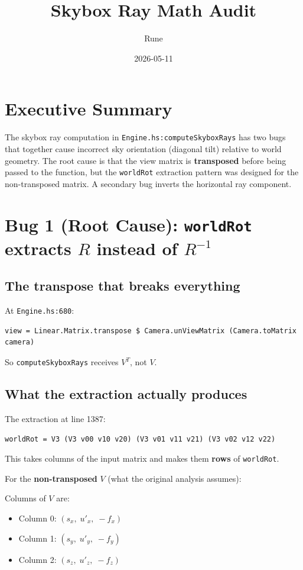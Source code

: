\documentclass{article}
\title{Skybox Ray Math Audit}
\author{Rune}
\date{2026-05-11}
\begin{document}
\maketitle

\section{Executive Summary}

The skybox ray computation in \texttt{Engine.hs:computeSkyboxRays} has two bugs
that together cause incorrect sky orientation (diagonal tilt) relative to world
geometry. The root cause is that the view matrix is \textbf{transposed} before
being passed to the function, but the \texttt{worldRot} extraction pattern was
designed for the non-transposed matrix. A secondary bug inverts the horizontal
ray component.

\section{Bug 1 (Root Cause): \texttt{worldRot} extracts $R$ instead of $R^{-1}$}

\subsection{The transpose that breaks everything}

At \texttt{Engine.hs:680}:
\begin{verbatim}
view = Linear.Matrix.transpose $ Camera.unViewMatrix (Camera.toMatrix camera)
\end{verbatim}

So \texttt{computeSkyboxRays} receives $V^T$, not $V$.

\subsection{What the extraction actually produces}

The extraction at line 1387:
\begin{verbatim}
worldRot = V3 (V3 v00 v10 v20) (V3 v01 v11 v21) (V3 v02 v12 v22)
\end{verbatim}

This takes columns of the input matrix and makes them \textbf{rows} of
\texttt{worldRot}.

For the \textbf{non-transposed} $V$ (what the original analysis assumes):

Columns of $V$ are:
\begin{itemize}
\item Column 0: $(s_x,\; u'_x,\; -f_x)$
\item Column 1: $(s_y,\; u'_y,\; -f_y)$
\item Column 2: $(s_z,\; u'_z,\; -f_z)$
\end{itemize}
\end{document}
